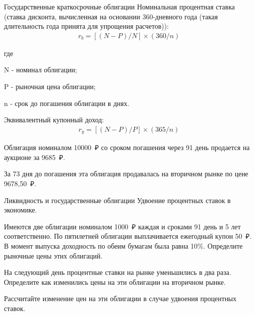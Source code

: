 \documentclass[_DKB_p1_Money.tex]{subfiles}
\begin{document}
\begin{frame}[allowframebreaks]{Государственные краткосрочные облигации}
Номинальная процентная ставка (ставка дисконта, вычисленная на основании 360-дневного года (такая длительность года принята для упрощения расчетов)):
\begin{align}
r_b=[(N-P)/N]\times (360/n)
\end{align}

где

N - номинал облигации;

P - рыночная цена облигации;

n - срок до погашения облигации в днях.

\pagebreak
Эквивалентный купонный доход:
\begin{align}
r_y=[(N-P)/P]\times (365/n)
\end{align}
\end{frame}

\begin{frame}
Облигация номиналом 10000~₽ со сроком погашения через 91 день продается на аукционе за 9685~₽. 

За 73 дня до погашения эта облигация продавалась на вторичном рынке по цене 9678,50~₽.



\end{frame}


\begin{frame}[ allowframebreaks]{Ликвидность и государственные облигации}
Удвоение процентных ставок в экономике.

Имеются две облигации номиналом 1000~₽ каждая и сроками 91 день и 5 лет соответственно. По пятилетней облигации выплачивается ежегодный купон 50~₽. В момент выпуска доходность по обеим бумагам была равна 10\%. Определите рыночные цены этих облигаций.

\pagebreak
На следующий день процентные ставки на рынке уменьшились в два раза. Определите как изменились цены на эти облигации на вторичном рынке.

Рассчитайте изменение цен на эти облигации в случае удвоения процентных ставок.
\end{frame}







\end{document}
